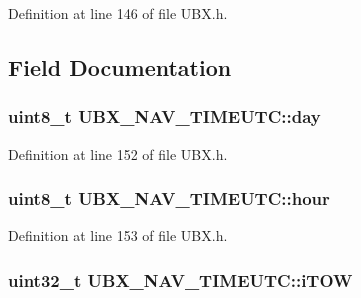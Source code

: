 \-Definition at line 146 of file \-U\-B\-X.\-h.



\subsection{\-Field \-Documentation}
\hypertarget{struct_u_b_x___n_a_v___t_i_m_e_u_t_c_af47b128d3c65964f825c689849546c6d}{
\subsubsection[{day}]{\setlength{\rightskip}{0pt plus 5cm}uint8\-\_\-t {\bf \-U\-B\-X\-\_\-\-N\-A\-V\-\_\-\-T\-I\-M\-E\-U\-T\-C\-::day}}}\label{struct_u_b_x___n_a_v___t_i_m_e_u_t_c_af47b128d3c65964f825c689849546c6d}


\-Definition at line 152 of file \-U\-B\-X.\-h.

\hypertarget{struct_u_b_x___n_a_v___t_i_m_e_u_t_c_a6685b128ba202f68bbba28ce3877d496}{
\subsubsection[{hour}]{\setlength{\rightskip}{0pt plus 5cm}uint8\-\_\-t {\bf \-U\-B\-X\-\_\-\-N\-A\-V\-\_\-\-T\-I\-M\-E\-U\-T\-C\-::hour}}}\label{struct_u_b_x___n_a_v___t_i_m_e_u_t_c_a6685b128ba202f68bbba28ce3877d496}


\-Definition at line 153 of file \-U\-B\-X.\-h.

\hypertarget{struct_u_b_x___n_a_v___t_i_m_e_u_t_c_ad71c5daaee202e2453fd942712b931d8}{
\subsubsection[{i\-T\-O\-W}]{\setlength{\rightskip}{0pt plus 5cm}uint32\-\_\-t {\bf \-U\-B\-X\-\_\-\-N\-A\-V\-\_\-\-T\-I\-M\-E\-U\-T\-C\-::i\-T\-O\-W}}}\label{struct_u_b_x___n_a_v___t_i_m_e_u_t_c_ad71c5daaee202e2453fd942712b931d8}


